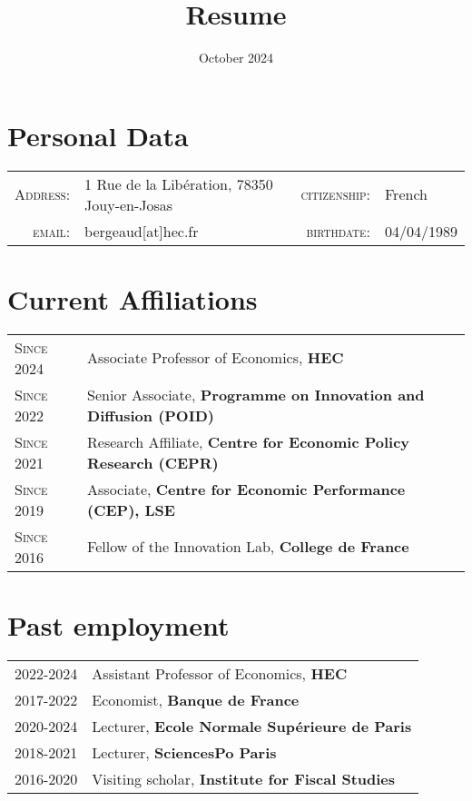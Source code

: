 \documentclass[12pt]{article}
\begin{document}
\title{\textbf{Resume}}
\date{October 2024}
\maketitle
\section*{Personal Data}

\begin{tabular}{r l r l }
    \textsc{Address:}   & 1 Rue de la Libération, 78350 Jouy-en-Josas  & \textsc{citizenship:} & French \\
    \textsc{email:}     & bergeaud[at]hec.fr &     \textsc{birthdate:} & 04/04/1989 \\ 
\end{tabular}

\section*{Current Affiliations}
\begin{tabular}{p{3cm}l}

\textsc{Since 2024} & Associate Professor of Economics, \textbf{HEC} \\
\textsc{Since 2022} & Senior Associate, \textbf{Programme on Innovation and Diffusion 
 (POID)} \\
\textsc{Since 2021} & Research Affiliate, \textbf{Centre for Economic Policy Research (CEPR)} \\
\textsc{Since 2019} & Associate, \textbf{Centre for Economic Performance (CEP), LSE} \\
\textsc{Since 2016} & Fellow of the Innovation Lab, \textbf{College de France} \\
\end{tabular}

\section*{Past employment}

\begin{tabular}{p{3cm}l}
\textsc{2022-2024} & Assistant Professor of Economics, \textbf{HEC} \\
\textsc{2017-2022} & Economist, \textbf{Banque de France} \\
\textsc{2020-2024} & Lecturer, \textbf{Ecole Normale Supérieure de Paris} \\
\textsc{2018-2021} & Lecturer, \textbf{SciencesPo Paris} \\
\textsc{2016-2020} & Visiting scholar, \textbf{Institute for Fiscal Studies}
\end{tabular}
\end{document}

